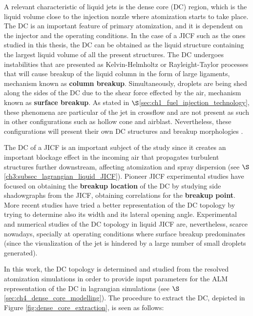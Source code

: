 A relevant characteristic of liquid jets is the dense core (DC) region, which is the liquid volume close to the injection nozzle where atomization starts to take place. The DC is an important feature of primary atomization, and it is dependent on the injector and the operating conditions. In the case of a JICF such as the ones studied in this thesis, the DC can be obtained as the liquid structure containing the largest liquid volume of all the present structures. The DC undergoes instabilities that are presented as Kelvin-Helmholtz or Rayleight-Taylor processes that will cause breakup of the liquid column in the form of large ligaments, mechanism known as \textbf{column breakup}. Simultaneously, droplets are being shed along the sides of the DC due to the shear force effected by the air, mechanism known as \textbf{surface breakup}. As stated in $\S$\ref{sec:ch1_fuel_injection_technology}, these phenomena are particular of the jet in crossflow and are not present as such in other configurations such as hollow cone and airblast. Nevertheless, these configurations will present their own DC structures and breakup morphologies .

The DC of a JICF is an important subject of the study since it creates an important blockage effect in the incoming air that propagates turbulent structures further downstream, affecting atomization and spray dispersion (see $\S$\ref{ch3:subsec_lagrangian_liquid_JICF}). Pioneer JICF experimental studies \citepColor[wu_breakup_1997] have focused on obtaining the \textbf{breakup location} of the DC by studying side shadowgraphs from the JICF, obtaining correlations for the \textbf{breakup point}. More recent studies  have tried a better representation of the DC topology by trying to determine also its width and its lateral opening angle. Experimental and numerical studies of the DC topology in liquid JICF are, nevertheless, scarce nowadays, specially at operating conditions where surface breakup predominates (since the visualization of the jet is hindered by a large number of small droplets generated).

In this work, the DC topology is determined and studied from the resolved atomization simulations in order to provide input parameters for the ALM representation of the DC in lagrangian simulations (see $\S$\ref{sec:ch4_dense_core_modelling}). The procedure to extract the DC, depicted in Figure \ref{fig:dense_core_extraction}, is seen as follows:

